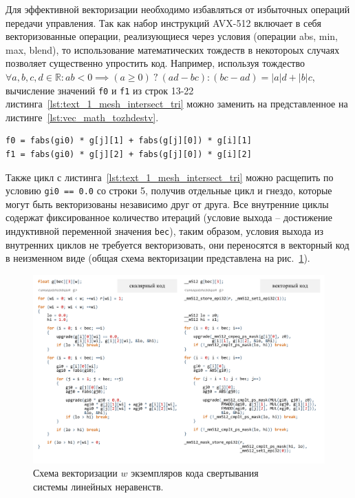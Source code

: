 Для эффективной векторизации необходимо избавляться от избыточных операций передачи управления.
Так как набор инструкций AVX-512 включает в себя векторизованные операции, реализующиеся через условия (операции abs, min, max, blend), то использование математических тождеств в некотороых случаях позволяет существенно упростить код.
Например, используя тождество $\forall a, b, c, d \in \mathbb{R} : ab < 0 \implies (a \ge 0) \ ? \ (ad - bc) : (bc - ad) = |a| d + |b| c$, вычисление значений \texttt{f0} и \texttt{f1} из строк 13-22 листинга~\ref{lst:text_1_mesh_intersect_tri} можно заменить на представленное на листинге~\ref{lst:vec_math_tozhdestv}.

\begin{singlespace}
\begin{lstlisting}[caption={Использование тождества для векторизации условия.},label={lst:text_4_mesh_intersect_tozh},label={lst:vec_math_tozhdestv}]
f0 = fabs(gi0) * g[j][1] + fabs(g[j][0]) * g[i][1]
f1 = fabs(gi0) * g[j][2] + fabs(g[j][0]) * g[i][2]
\end{lstlisting}
\end{singlespace}

Также цикл с листинга~\ref{lst:text_1_mesh_intersect_tri} можно расщепить по условию \texttt{gi0 == 0.0} со строки 5, получив отдельные цикл и гнездо, которые могут быть векторизованы независимо друг от друга.
Все внутренние циклы содержат фиксированное количество итераций (условие выхода -- достижение индуктивной переменной значения \texttt{bec}), таким образом, условия выхода из внутренних циклов не требуется векторизовать, они переносятся в векторный код в неизменном виде (общая схема векторизации представлена на рис.~\ref{fig:text_1_mesh_intersect_scheme}).

\begin{figure}[ht]
\centering
\includegraphics[width=1.0\textwidth]{fig/vec_mesh_intersect_final_scheme.pdf}
\singlespacing
{}\caption{Схема векторизации $w$ экземпляров кода свертывания \\ системы линейных неравенств.}
\label{fig:text_1_mesh_intersect_scheme}
\end{figure}

